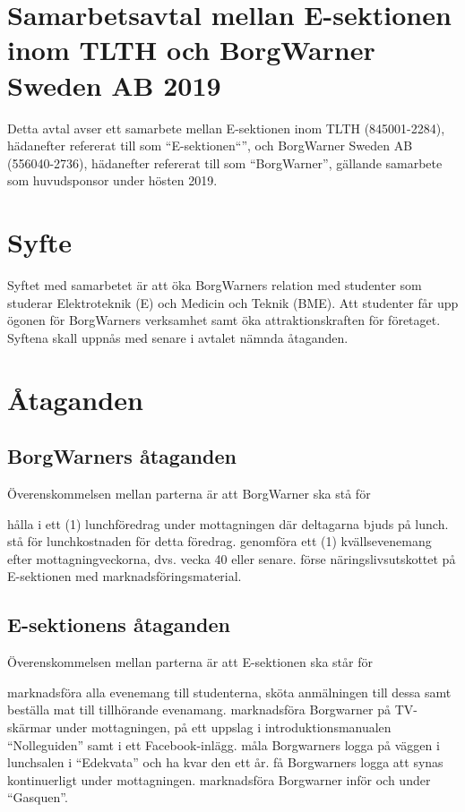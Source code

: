 \documentclass[10pt]{article}
\def\year{2019}
\def\doctitle{Samarbetsavtal mellan E-sektionen inom TLTH och BorgWarner Sweden AB {\year}}
\begin{document}
        \section*{\doctitle}
        Detta avtal avser ett samarbete mellan E-sektionen inom TLTH (845001-2284), hädanefter refererat till som “E-sektionen“”, och BorgWarner Sweden AB (556040-2736), hädanefter refererat till som  “BorgWarner”, gällande samarbete som huvudsponsor under hösten 2019.\\
        \section{Syfte}
       
       
        Syftet med samarbetet är att öka BorgWarners relation med studenter som studerar Elektroteknik (E) och Medicin och Teknik (BME). Att studenter får upp ögonen för BorgWarners verksamhet samt öka attraktionskraften för företaget. Syftena skall uppnås med senare i avtalet nämnda åtaganden.
       
       
       
        \section{Åtaganden}
        \subsection{BorgWarners åtaganden}
        Överenskommelsen mellan parterna är att BorgWarner ska stå för
        \begin{attsatser}
            \att hålla i ett (1) lunchföredrag under mottagningen där deltagarna bjuds på lunch.
            \att stå för lunchkostnaden för detta föredrag. 
            \att genomföra ett (1) kvällsevenemang efter mottagningveckorna, dvs. vecka 40 eller senare.
            \att förse näringslivsutskottet på E-sektionen med marknadsföringsmaterial.
        \end{attsatser}

        \subsection{E-sektionens åtaganden}
        Överenskommelsen mellan parterna är att E-sektionen ska står för
        \begin{attsatser}
            \att marknadsföra alla evenemang till studenterna, sköta anmälningen till dessa samt beställa mat till tillhörande evenamang.
            \att marknadsföra Borgwarner på TV-skärmar under mottagningen, på ett uppslag i introduktionsmanualen “Nolleguiden” samt i ett Facebook-inlägg.
            \att måla Borgwarners logga på väggen i lunchsalen i “Edekvata” och ha kvar den ett år.
            \att få Borgwarners logga att synas kontinuerligt under mottagningen.
            \att marknadsföra Borgwarner inför och under “Gasquen”.
            
        \end{attsatser}
        
\end{document}
